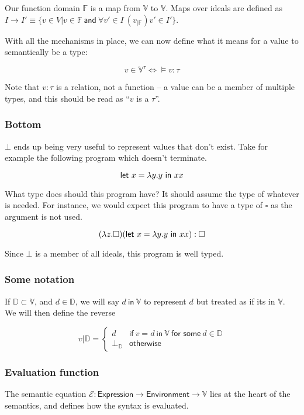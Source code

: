 Our function domain $\mathbb{F}$ is a map from $\mathbb{V}$ to
$\mathbb{V}$. Maps over ideals are defined as
$I \rightarrow I' \equiv \{ v \in V | v \in \mathbb{F} \ \mathsf{and} \ \forall v' \in I \
(v_{|\mathbb{F}})v' \in I' \}$.

With all the mechanisms in place, we can now define what it means for
a value to semantically be a type:

\[v \in \mathbb{V}^\tau \iff \vDash v : \tau\]

Note that $v : \tau$ is a relation, not a function -- a value can be a
member of multiple types, and this should be read as ``$v$ is a $\tau$''.

\subsubsection{Bottom}
$\bot$ ends up being very useful to represent values that don't exist.
Take for example the following program which doesn't terminate. 

\[\mathsf{let} \ x = \lambda y. y \ \mathsf{in} \ x x\]

What type does should this program have? It should assume the
type of whatever is needed. For instance, we would expect this program
to have a type of $\square$ as the argument is not used.

\[ (\lambda z. \square) (\mathsf{let} \ x = \lambda y. y \ \mathsf{in} \ x x) : \square \]

Since $\bot$ is a member of all ideals, this program is well typed.

\subsubsection{Some notation}

If $\mathbb{D} \subset \mathbb{V}$, and $d \in \mathbb{D}$, we will say $d \ \mathsf{in} \
\mathbb{V}$ to represent $d$ but treated as if its in $\mathbb{V}$. \\
We will then define the reverse

$$v | \mathbb{D} =
\begin{cases}
  d & \textsf{if} \ v = d \ \textsf{in} \ \mathbb{V} \ \textsf{for
    some} \ d \in \mathbb{D} \\
  \bot_{\mathbb{D}} & \textsf{otherwise}
\end{cases}
$$


\subsubsection{Evaluation function}
The semantic equation $\mathcal{E} : \mathsf{Expression} \rightarrow
\mathsf{Environment} \rightarrow \mathbb{V}$ lies at the heart of the semantics,
and defines how the syntax is evaluated.

